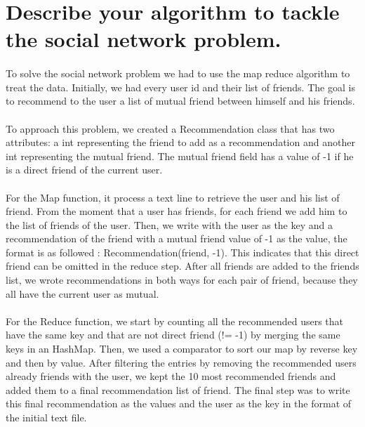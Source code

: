 \section{Describe your algorithm to tackle the social network problem.} \label{T5}

\paragraph{}To solve the social network problem we had to use the map reduce algorithm to treat the data. Initially, we had every user id and their list of friends. The goal is to recommend to the user a list of mutual friend between himself and his friends. 

\paragraph{}To approach this problem, we created a Recommendation class that has two attributes: a int representing the friend to add as a recommendation and another int representing the mutual friend. The mutual friend field has a value of -1 if he is a direct friend of the current user. 

\paragraph{}For the Map function, it process a text line to retrieve the user and his list of friend. From the moment that a user has friends, for each friend we add him to the list of friends of the user. Then, we write with the user as the key and a recommendation of the friend with a mutual friend value of -1 as the value, the format is as followed : Recommendation(friend, -1). This indicates that this direct friend can be omitted in the reduce step. After all friends are added to the friends list, we wrote recommendations in both ways for each pair of friend, because they all have the current user as mutual.

\paragraph{}For the Reduce function, we start by counting all the recommended users that have the same key and that are not direct friend (!= -1) by merging the same keys in an HashMap. Then, we used a comparator to sort our map by reverse key and then by value. After filtering the entries by removing the recommended users already friends with the user, we kept the 10 most recommended friends and added them to a final recommendation list of friend. The final step was to write this final recommendation as the values and the user as the key in the format of the initial text file.
\pagebreak
